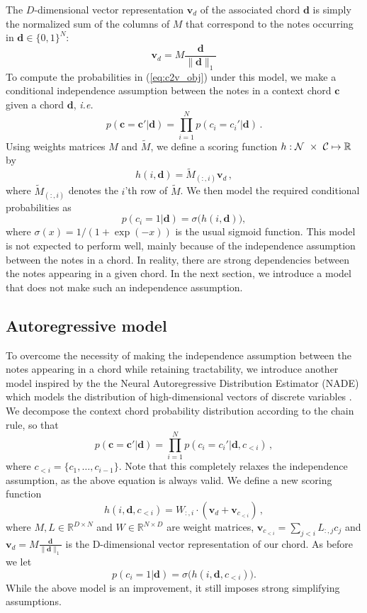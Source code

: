 \documentclass{article}
\newcommand{\R}{\mathbb{R}}
\newcommand{\M}{\tilde{M}}
\newcommand{\boldc}{\boldsymbol c}
\newcommand{\boldd}{\boldsymbol d}
\newcommand{\boldvd}{\boldsymbol v_d}
\newcommand{\boldvci}{\boldsymbol v_{c_{<i}}}
\newcommand{\ie}{\textit{i.e.}}
\begin{document}
The $D$-dimensional vector representation $\boldvd$ of the associated chord $\boldd$ is simply the normalized sum of the columns of $M$ that correspond to the notes occurring in $\boldd \in \{0,1\}^N$:
\[ \boldvd = M\frac{ \boldd}{\| \boldd \|_1}
\]
To compute the probabilities in (\ref{eq:c2v_obj}) under this model, we make a  conditional independence assumption between the notes in a context chord $\boldc$ given a chord $\boldd$, \ie\
%
\begin{equation}
p(\boldc =\boldc' | \boldd) = \prod_{i=1}^N  p(c_i =c_i'|  \boldd) \,.
\end{equation} 
%
Using weights matrices $M$ and $\M$, we define a scoring function $\nobreak{h: \mathcal{N}~\times~\mathcal{C}\mapsto\mathbb{R}}$ by
\begin{equation}
h(i,\boldd) =  \M_{(:,i)} \boldvd \,,
\end{equation}
where $\M_{(:,i)}$ denotes the $i$'th row of $\M$. We then model the required conditional probabilities as
\begin{equation}
p(c_i =1|\boldd) = \sigma\big( h(i,\boldd) \big),
\end{equation}
where $\sigma(x)=1/(1+\exp(-x))$ is the usual sigmoid function.
This model is not expected to perform well, mainly because of the independence assumption between the notes in a chord. In reality, there are strong dependencies between the notes appearing in a given chord. In the next section, we introduce a model that does not make such an independence assumption. 

\subsection{Autoregressive model}

To overcome the necessity of making the independence assumption between the notes appearing in a chord while retaining tractability, we introduce another model inspired by the the Neural Autoregressive Distribution Estimator (NADE) which models the distribution of high-dimensional vectors of discrete variables \citep{larochelle2011}. We decompose the context chord probability distribution according to the chain rule, so that
%
\begin{equation}
p(\boldc =\boldc' | \boldd) = \prod_{i=1}^N  p(c_i =c_i'|  \boldd, c_{<i}) \,,
\end{equation} 
%
where $c_{<i} = \{c_1, \ldots, c_{i-1}\}$. Note that this completely relaxes the independence assumption, as the above equation is always valid. We define a new scoring function
%
\begin{equation}
h(i,\boldd,c_{<i}) =  W_{:,i} \cdot (\boldvd + \boldvci) \,,
\end{equation}
%
where $M, L \in \R^{D \times N}$ and $W\in \R^{N \times D}$ are weight matrices, $\boldvci=\sum_{j<i}  L_{:,j} c_j$ and $\boldvd = M\frac{ \boldd}{\| \boldd \|_1}$ is the D-dimensional vector representation of our chord.
As before we let
\begin{equation}
p(c_i =1|\boldd) = \sigma\big( h(i,\boldd,c_{<i}) \big).
\end{equation}
While the above model is an improvement, it still imposes strong simplifying assumptions.
%
\end{document}
